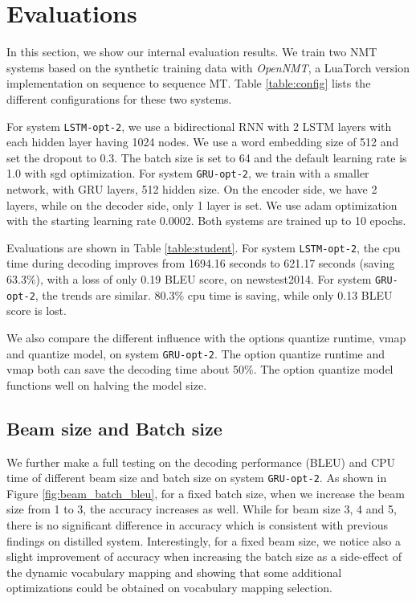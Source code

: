 \documentclass[11pt,a4paper]{article}
\begin{document}
\section{Evaluations}

In this section, we show our internal evaluation results.
We train two NMT systems based on the synthetic training data with \textit{OpenNMT}, a LuaTorch version implementation on sequence to sequence MT. Table \ref{table:config} lists the different configurations for these two systems.

For system {\tt LSTM-opt-2}, we use a bidirectional RNN with 2 LSTM layers with each hidden layer having 1024 nodes.
We use a word embedding size of 512 and set the dropout to 0.3.
The batch size is set to 64 and the default learning rate is 1.0 with sgd optimization.
For system {\tt GRU-opt-2}, we train with a smaller network, with GRU layers, 512 hidden size.
On the encoder side, we have 2 layers, while on the decoder side, only 1 layer is set.
We use adam optimization with the starting learning rate 0.0002.
Both systems are trained up to 10 epochs.

Evaluations are shown in Table \ref{table:student}.
For system {\tt LSTM-opt-2}, the cpu time during decoding improves from 1694.16 seconds to 621.17 seconds (saving 63.3\%), with a loss of only 0.19 BLEU score, on newstest2014.
For system {\tt GRU-opt-2}, the trends are similar.
80.3\% cpu time is saving, while only 0.13 BLEU score is lost.

We also compare the different influence with the options quantize runtime, vmap and quantize model, on system {\tt GRU-opt-2}.
The option quantize runtime and vmap both can save the decoding time about 50\%.
The option quantize model functions well on halving the model size.

\subsection{Beam size and Batch size}

We further make a full testing on the decoding performance (BLEU) and CPU time of different beam size and batch size on system {\tt GRU-opt-2}.
As shown in Figure \ref{fig:beam_batch_bleu}, for a fixed batch size, when we increase the beam size from 1 to 3, the accuracy increases as well.
While for beam size 3, 4 and 5, there is no significant difference in accuracy which is consistent with previous findings on distilled system.
Interestingly, for a fixed beam size, we notice also a slight improvement of accuracy when increasing the batch size as a side-effect of the dynamic vocabulary mapping and showing that some additional optimizations could be obtained on vocabulary mapping selection.
\end{document}
